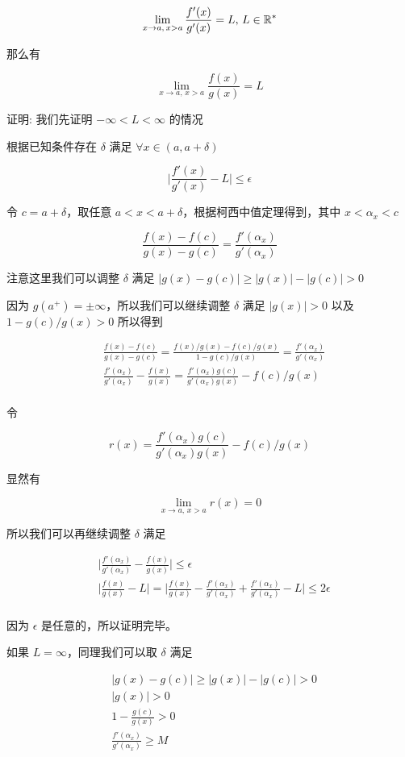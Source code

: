 \[
\lim_{x \to a,\, x >a} \frac{f'(x)}{g'(x)} = L ,\, L \in \mathbb{R}^*
\]

那么有

\[
\lim_{x \to a,\, x >a} \frac{f(x)}{g(x)} = L
\]

证明: 我们先证明 $-\infty < L < \infty$ 的情况

根据已知条件存在 $\delta$ 满足 $\forall x \in (a, a+\delta)$

\[
    \lvert \frac{f'(x)}{g'(x)} - L \rvert \le \epsilon 
\]

令 $c = a + \delta$，取任意 $a < x < a + \delta$，根据柯西中值定理得到，其中 $x < \alpha_x < c$

\[
    \frac{f(x) - f(c)}{g(x) - g(c)} = \frac{f'(\alpha_x)}{g'(\alpha_x)}
\]

注意这里我们可以调整 $\delta$ 满足 $\lvert g(x) - g(c)\rvert \ge \lvert g(x)\rvert - \lvert g(c)\rvert >0$

因为 $g(a^+) = \pm \infty$，所以我们可以继续调整 $\delta$ 满足 $\lvert g(x) \rvert > 0$ 以及 $1- g(c)/g(x) > 0$ 所以得到


\begin{align*}
    & \frac{f(x) - f(c)}{g(x) - g(c)} = \frac{f(x)/g(x)- f(c)/g(x)}{1- g(c)/g(x)} = \frac{f'(\alpha_x)}{g'(\alpha_x)} \\
    & \frac{f'(\alpha_x)}{g'(\alpha_x)} - \frac{f(x)}{g(x)} = \frac{f'(\alpha_x)g(c)}{g'(\alpha_x) g(x)} -f(c)/g(x) \\
\end{align*}

令

\[
r(x) = \frac{f'(\alpha_x)g(c)}{g'(\alpha_x) g(x)} -f(c)/g(x)
\]

显然有

\[
\lim_{x \to a,\, x>a}r(x) = 0
\]

所以我们可以再继续调整 $\delta$ 满足

\begin{align*}
    & \lvert \frac{f'(\alpha_x)}{g'(\alpha_x)} - \frac{f(x)}{g(x)}  \rvert \le \epsilon \\
    & \lvert \frac{f(x)}{g(x)}  - L \rvert = \lvert \frac{f(x)}{g(x)}  - \frac{f'(\alpha_x)}{g'(\alpha_x)} + \frac{f'(\alpha_x)}{g'(\alpha_x)} - L \rvert \le 2\epsilon \\
\end{align*}

因为 $\epsilon$ 是任意的，所以证明完毕。

如果 $L = \infty$，同理我们可以取 $\delta$ 满足 

\begin{align*}
    & \lvert g(x) - g(c)\rvert \ge \lvert g(x)\rvert - \lvert g(c)\rvert >0 \\
    & \lvert g(x)\rvert > 0 \\
    & 1- \frac{g(c)}{g(x)} > 0 \\
    & \frac{f'(\alpha_x)}{g'(\alpha_x)} \ge M 
\end{align*}


